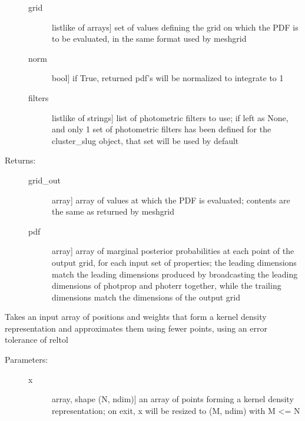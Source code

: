 \documentclass[letterpaper,10pt,english]{sphinxmanual}
\begin{document}
\begin{fulllineitems}
\begin{fulllineitems}
\begin{description}
\begin{description}
\item[{grid}] \leavevmode{[}listlike of arrays{]}
set of values defining the grid on which the PDF is to
be evaluated, in the same format used by meshgrid

\item[{norm}] \leavevmode{[}bool{]}
if True, returned pdf’s will be normalized to integrate
to 1

\item[{filters}] \leavevmode{[}listlike of strings{]}
list of photometric filters to use; if left as None, and
only 1 set of photometric filters has been defined for
the cluster\_slug object, that set will be used by
default

\end{description}

\item[{Returns:}] \leavevmode\begin{description}
\item[{grid\_out}] \leavevmode{[}array{]}
array of values at which the PDF is evaluated; contents
are the same as returned by meshgrid

\item[{pdf}] \leavevmode{[}array{]}
array of marginal posterior probabilities at each point
of the output grid, for each input set of properties; the leading
dimensions match the leading dimensions produced by
broadcasting the leading dimensions of photprop and
photerr together, while the trailing dimensions match
the dimensions of the output grid

\end{description}

\end{description}

\end{fulllineitems}


\begin{fulllineitems}
\label{\detokenize{cluster_slug:slugpy.cluster_slug.cluster_slug.squeeze_rep}}
Takes an input array of positions and weights that form a
kernel density representation and approximates them using
fewer points, using an error tolerance of reltol
\begin{description}
\item[{Parameters:}] \leavevmode\begin{description}
\item[{x}] \leavevmode{[}array, shape (N, ndim){]}
an array of points forming a kernel density
representation; on exit, x will be resized to (M, ndim)
with M \textless{}= N


\end{description}
\end{description}
\end{fulllineitems}
\end{fulllineitems}
\end{document}
